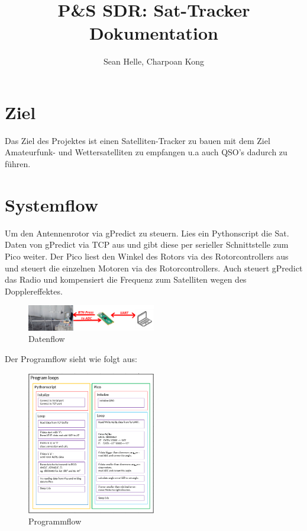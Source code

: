 \documentclass{article}
\title{P\&S SDR: Sat-Tracker Dokumentation}
\date{}
\author{Sean Helle, Charpoan Kong}
\begin{document}
\maketitle

\section*{Ziel}
Das Ziel des Projektes ist einen Satelliten-Tracker zu bauen mit dem Ziel Amateurfunk- und Wettersatelliten zu empfangen u.a auch QSO's dadurch zu führen.

\section*{Systemflow}
Um den Antennenrotor via gPredict zu steuern. Lies ein Pythonscript die Sat. Daten von gPredict via TCP aus und gibt diese per serieller Schnittstelle zum Pico weiter. Der Pico liest den Winkel des Rotors via des Rotorcontrollers aus und steuert die einzelnen Motoren via des Rotorcontrollers. Auch steuert gPredict das Radio und kompensiert die Frequenz zum Satelliten wegen des Dopplereffektes.

\begin{figure}[h]
\includegraphics[width=0.5\textwidth]{Over}
\centering 
\caption{Datenflow}
\end{figure}
Der Programflow sieht wie folgt aus:

\begin{figure}[h]
\includegraphics[width=0.5\textwidth]{Flow}
\centering 
\caption{Programmflow}
\end{figure}
\end{document}
